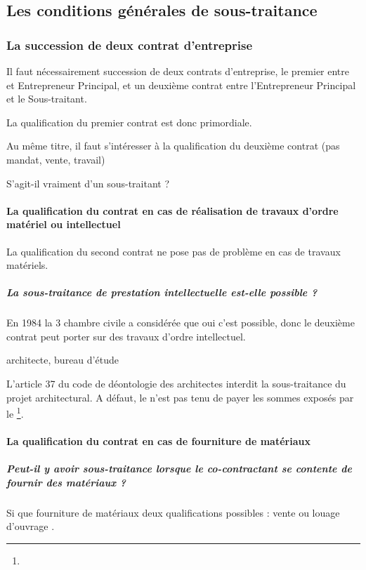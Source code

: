 	\subsection{Les conditions générales de sous-traitance}

		\subsubsection{La succession de deux contrat d'entreprise}

			Il faut nécessairement succession de deux contrats d’entreprise, le premier entre \E et Entrepreneur Principal, et un deuxième contrat entre l’Entrepreneur Principal et le Sous-traitant.


			La qualification du premier contrat est donc primordiale.


			Au même titre, il faut s’intéresser à la qualification du deuxième contrat (pas mandat, vente, travail)

			S’agit-il vraiment d’un sous-traitant ?


			\paragraph{La qualification du contrat en cas de réalisation de travaux d'ordre matériel ou intellectuel} La qualification du second contrat ne pose pas de problème en cas de travaux matériels.


				\subparagraph{La sous-traitance de prestation intellectuelle est-elle possible ?}
				En 1984 la 3\ieme{} chambre civile a considérée que oui c’est possible, donc le deuxième contrat peut porter sur des travaux d’ordre intellectuel.

				\begin{exemple}
					architecte, bureau d’étude
				\end{exemple}

				L'article 37 du code de déontologie des architectes interdit la sous-traitance du projet architectural. A défaut, le \Mo n’est pas tenu de payer les sommes exposés par le \Moe\footnote{}.

			\paragraph{La qualification du contrat en cas de fourniture de matériaux}

				\subparagraph{Peut-il y avoir sous-traitance lorsque le co-contractant se contente de fournir des matériaux ?}
				Si que fourniture de matériaux deux qualifications possibles : vente ou louage d’ouvrage
.

